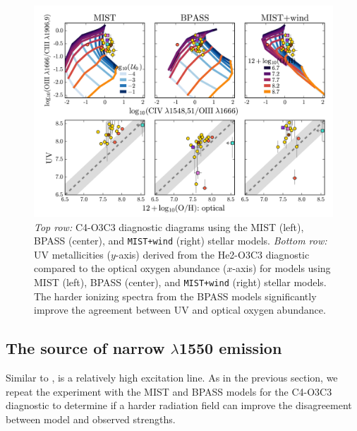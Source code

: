 \documentclass[preprint2]{aastex62}
\newcommand{\heii}{\ion{He}{2}}
\newcommand{\civ}{\ion{C}{4}}
\begin{document}
\begin{figure}
  \begin{center}
    \includegraphics[width=\linewidth]{figs/f9.png}
    \caption{\emph{Top row:} C4-O3C3 diagnostic diagrams using the MIST (left), BPASS (center), and {\tt MIST+wind} (right) stellar models. \emph{Bottom row:} UV metallicities ($y$-axis) derived from the He2-O3C3 diagnostic compared to the optical oxygen abundance ($x$-axis) for models using MIST (left), BPASS (center), and {\tt MIST+wind} (right) stellar models. The harder ionizing spectra from the BPASS models significantly improve the agreement between UV and optical oxygen abundance.}
    \label{fig:CIVdds}
  \end{center}
\end{figure}

\subsection{The source of narrow \civ$\lambda$1550 emission} \label{sec:discussion:CIV}

Similar to \heii{}, \civ{} is a relatively high excitation line. As in the previous section, we repeat the experiment with the MIST and BPASS models for the C4-O3C3 diagnostic to determine if a harder radiation field can improve the disagreement between model and observed \civ{} strengths.
\end{document}
